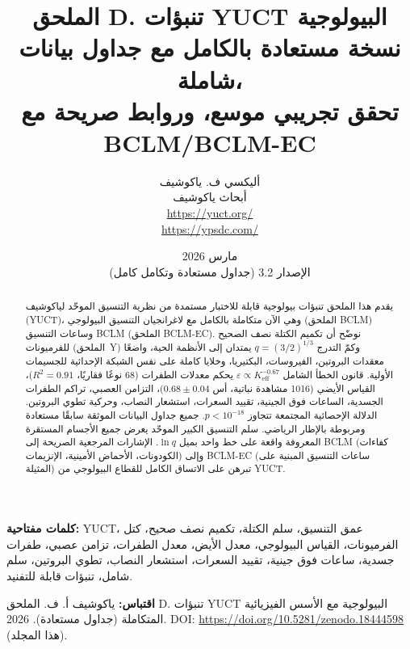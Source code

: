 \documentclass[11pt,a4paper]{article}
\begin{document}
	
	\title{\Huge\textbf{الملحق D. تنبؤات YUCT البيولوجية}\\[0.3cm]
		\Large نسخة مستعادة بالكامل مع جداول بيانات شاملة،\\[0.2cm]
		تحقق تجريبي موسع، وروابط صريحة مع BCLM/BCLM-EC}
	\author{أليكسي ف. ياكوشيف \\ 
		أبحاث ياكوشيف \\ \url{https://yuct.org/} \\ \url{https://ypsdc.com/}}
	\date{مارس 2026 \\ الإصدار 3.2 (جداول مستعادة وتكامل كامل)}
	
	\maketitle
	
	\begin{abstract}
		\noindent
		يقدم هذا الملحق تنبؤات بيولوجية قابلة للاختبار مستمدة من نظرية التنسيق الموحّد لياكوشيف (YUCT)، وهي الآن متكاملة بالكامل مع لاغرانجيان التنسيق البيولوجي (الملحق BCLM) وساعات التنسيق BCLM (الملحق BCLM-EC). نوضّح أن تكميم الكتلة نصف الصحيح للفرميونات (الملحق~Y) وكمّ التدرج \(q = (3/2)^{1/3}\) يمتدان إلى الأنظمة الحية، واضعًا معقدات البروتين، الفيروسات، البكتيريا، وخلايا كاملة على نفس الشبكة الإحداثية للجسيمات الأولية. قانون الخطأ الشامل \(\varepsilon \propto K_{\mathrm{eff}}^{-0.67}\) يحكم معدلات الطفرات (68 نوعًا فقاريًا، \(R^2 = 0.91\))، القياس الأيضي (1016 مشاهدة نباتية، أس \(0.68 \pm 0.04\))، التزامن العصبي، تراكم الطفرات الجسدية، الساعات فوق الجينية، تقييد السعرات، استشعار النصاب، وحركية تطوي البروتين. الدلالة الإحصائية المجتمعة تتجاوز \(p < 10^{-18}\). جميع جداول البيانات الموثقة سابقًا مستعادة ومربوطة بالإطار الرياضي. سلم التنسيق الكبير الموحّد يعرض جميع الأجسام المستقرة المعروفة واقعة على خط واحد بميل \(\ln q\). الإشارات المرجعية الصريحة إلى BCLM (كفاءات الكودونات، الأحماض الأمينية، الإنزيمات) وإلى BCLM-EC (ساعات التنسيق المبنية على المثيلة) تبرهن على الاتساق الكامل للقطاع البيولوجي من YUCT.
	\end{abstract}
	
	\vspace{0.2cm}
	\noindent
	\textbf{كلمات مفتاحية:} YUCT، عمق التنسيق، سلم الكتلة، تكميم نصف صحيح، كتل الفرميونات، القياس البيولوجي، معدل الأيض، معدل الطفرات، تزامن عصبي، طفرات جسدية، ساعات فوق جينية، تقييد السعرات، استشعار النصاب، تطوي البروتين، سلم شامل، تنبؤات قابلة للتفنيد.
	
	\vspace{0.1cm}
	\noindent
	\textbf{اقتباس:} ياكوشيف أ. ف. الملحق D. تنبؤات YUCT البيولوجية مع الأسس الفيزيائية المتكاملة (جداول مستعادة). 2026. DOI: \url{https://doi.org/10.5281/zenodo.18444598} (هذا المجلد).
	
\end{document}
